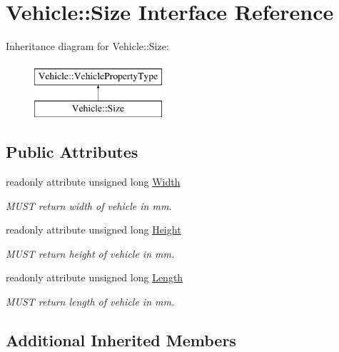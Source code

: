 \hypertarget{interfaceVehicle_1_1Size}{\section{Vehicle\-:\-:Size Interface Reference}
\label{interfaceVehicle_1_1Size}
}
Inheritance diagram for Vehicle\-:\-:Size\-:\begin{figure}[H]
\begin{center}
\leavevmode
\includegraphics[height=2.000000cm]{interfaceVehicle_1_1Size}
\end{center}
\end{figure}
\subsection*{Public Attributes}
\begin{DoxyCompactItemize}
\item 
readonly attribute unsigned long \hyperlink{interfaceVehicle_1_1Size_ad62490f0d79e1d9153aa66ae3bb62d97}{Width}
\begin{DoxyCompactList}\small\item\em M\-U\-S\-T return width of vehicle in mm. \end{DoxyCompactList}\item 
readonly attribute unsigned long \hyperlink{interfaceVehicle_1_1Size_a011b39b5ca3b37c1f71662b6dcf72e10}{Height}
\begin{DoxyCompactList}\small\item\em M\-U\-S\-T return height of vehicle in mm. \end{DoxyCompactList}\item 
readonly attribute unsigned long \hyperlink{interfaceVehicle_1_1Size_a228ef4095ed8c5b07159d520d0bdb99a}{Length}
\begin{DoxyCompactList}\small\item\em M\-U\-S\-T return length of vehicle in mm. \end{DoxyCompactList}\end{DoxyCompactItemize}
\subsection*{Additional Inherited Members}


